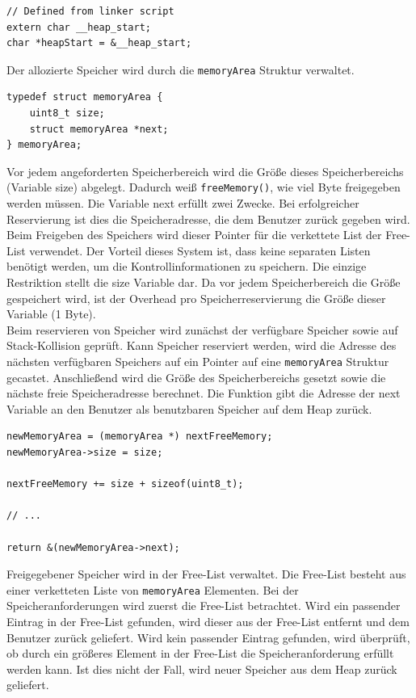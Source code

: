 \documentclass[fontsize=12pt, toc=bibliography, notitlepage]{scrreprt}
\begin{document}
\begin{lstlisting}[title=memory.c]
// Defined from linker script
extern char __heap_start;
char *heapStart = &__heap_start;
\end{lstlisting}

Der allozierte Speicher wird durch die \lstinline$memoryArea$ Struktur verwaltet. 

\begin{lstlisting}[title=memory.c]
typedef struct memoryArea {
    uint8_t size;
    struct memoryArea *next;
} memoryArea;
\end{lstlisting}

Vor jedem angeforderten Speicherbereich wird die Größe dieses Speicherbereichs (Variable size) abgelegt. Dadurch weiß \lstinline$freeMemory()$, wie viel Byte freigegeben werden müssen. Die Variable next erfüllt zwei Zwecke. Bei erfolgreicher Reservierung ist dies die Speicheradresse, die dem Benutzer zurück gegeben wird. Beim Freigeben des Speichers wird dieser Pointer für die verkettete List der Free-List verwendet. Der Vorteil dieses System ist, dass keine separaten Listen benötigt werden, um die Kontrollinformationen zu speichern. Die einzige Restriktion stellt die size Variable dar. Da vor jedem Speicherbereich die Größe gespeichert wird, ist der Overhead pro Speicherreservierung die Größe dieser Variable (1 Byte). \\

Beim reservieren von Speicher wird zunächst der verfügbare Speicher sowie auf Stack-Kollision geprüft. Kann Speicher reserviert werden, wird die Adresse des nächsten verfügbaren Speichers auf ein Pointer auf eine \lstinline$memoryArea$ Struktur gecastet. Anschließend wird die Größe des Speicherbereichs gesetzt sowie die nächste freie Speicheradresse berechnet. Die Funktion gibt die Adresse der next Variable an den Benutzer als benutzbaren Speicher auf dem Heap zurück.

\begin{lstlisting}[title=memory.c]
newMemoryArea = (memoryArea *) nextFreeMemory;
newMemoryArea->size = size;

nextFreeMemory += size + sizeof(uint8_t);

// ...

return &(newMemoryArea->next);
\end{lstlisting}

Freigegebener Speicher wird in der Free-List verwaltet. Die Free-List besteht aus einer verketteten Liste von \lstinline$memoryArea$ Elementen. Bei der Speicheranforderungen wird zuerst die Free-List betrachtet. Wird ein passender Eintrag in der Free-List gefunden, wird dieser aus der Free-List entfernt und dem Benutzer zurück geliefert. Wird kein passender Eintrag gefunden, wird überprüft, ob durch ein größeres Element in der Free-List die Speicheranforderung erfüllt werden kann. Ist dies nicht der Fall, wird neuer Speicher aus dem Heap zurück geliefert.
\end{document}
